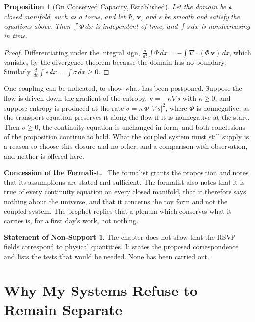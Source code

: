 \documentclass[11pt,openany,twoside]{book}
\theoremstyle{plain}
\newtheorem{proposition}{Proposition}[chapter]
\theoremstyle{definition}
\newtheorem{nonsupport}{Statement of Non-Support}
\theoremstyle{remark}
\newenvironment{concession}{\par\medskip\noindent\textbf{Concession of the Formalist.}\ }{\par\medskip}
\begin{document}
\begin{proposition}[On Conserved Capacity, Established]\label{prop:capacity}
Let the domain be a closed manifold, such as a torus, and let $\Phi$, $\mathbf v$, and $s$ be smooth and satisfy the equations above. Then $\int\Phi\,dx$ is independent of time, and $\int s\,dx$ is nondecreasing in time.
\end{proposition}

\begin{proof}
Differentiating under the integral sign, $\frac{d}{dt}\int\Phi\,dx = -\int\nabla\!\cdot(\Phi\,\mathbf v)\,dx$, which vanishes by the divergence theorem because the domain has no boundary. Similarly $\frac{d}{dt}\int s\,dx = \int\sigma\,dx \ge 0$.
\end{proof}

One coupling can be indicated, to show what has been postponed. Suppose the flow is driven down the gradient of the entropy, $\mathbf v=-\kappa\nabla s$ with $\kappa\ge 0$, and suppose entropy is produced at the rate $\sigma=\kappa\,\Phi\,|\nabla s|^{2}$, where $\Phi$ is nonnegative, as the transport equation preserves it along the flow if it is nonnegative at the start. Then $\sigma\ge 0$, the continuity equation is unchanged in form, and both conclusions of the proposition continue to hold. What the coupled system must still supply is a reason to choose this closure and no other, and a comparison with observation, and neither is offered here.

\begin{concession}
The formalist grants the proposition and notes that its assumptions are stated and sufficient. The formalist also notes that it is true of every continuity equation on every closed manifold, that it therefore says nothing about the universe, and that it concerns the toy form and not the coupled system. The prophet replies that a plenum which conserves what it carries is, for a first day's work, not nothing.
\end{concession}

\begin{nonsupport}
The chapter does not show that the RSVP fields correspond to physical quantities. It states the proposed correspondence and lists the tests that would be needed. None has been carried out.
\end{nonsupport}

\chapter{Why My Systems Refuse to Remain Separate}
\end{document}
